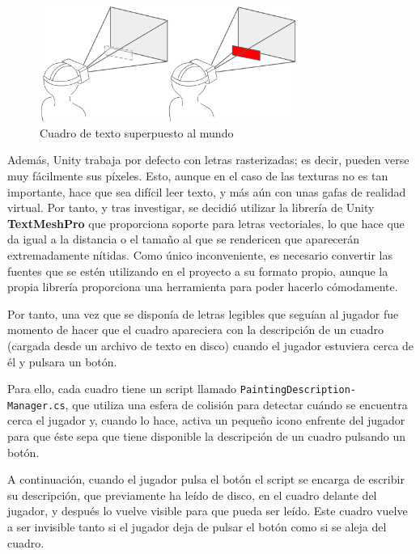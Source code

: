 \begin{figure}[!h]
\begin{center}
\includegraphics[width=0.75\textwidth]{imagenes/7/camera-overlay.png}
\caption{Cuadro de texto superpuesto al mundo}
\label{fig:camera-overlay}
\end{center}
\end{figure}

Además, Unity trabaja por defecto con letras rasterizadas; es decir, pueden verse muy fácilmente sus píxeles. Esto, aunque en el caso de las texturas no es tan importante, hace que sea difícil leer texto, y más aún con unas gafas de realidad virtual. Por tanto, y tras investigar, se decidió utilizar la librería de Unity \textbf{TextMeshPro} que proporciona soporte para letras vectoriales, lo que hace que da igual a la distancia o el tamaño al que se rendericen que aparecerán extremadamente nítidas. Como único inconveniente, es necesario convertir las fuentes que se estén utilizando en el proyecto a su formato propio, aunque la propia librería proporciona una herramienta para poder hacerlo cómodamente.

Por tanto, una vez que se disponía de letras legibles que seguían al jugador fue momento de hacer que el cuadro apareciera con la descripción de un cuadro (cargada desde un archivo de texto en disco) cuando el jugador estuviera cerca de él y pulsara un botón.

Para ello, cada cuadro tiene un script llamado \texttt{PaintingDescription-} \texttt{Manager.cs}, que utiliza una esfera de colisión para detectar cuándo se encuentra cerca el jugador y, cuando lo hace, activa un pequeño icono enfrente del jugador para que éste sepa que tiene disponible la descripción de un cuadro pulsando un botón.

A continuación, cuando el jugador pulsa el botón el script se encarga de escribir su descripción, que previamente ha leído de disco, en el cuadro delante del jugador, y después lo vuelve visible para que pueda ser leído. Este cuadro vuelve a ser invisible tanto si el jugador deja de pulsar el botón como si se aleja del cuadro.

